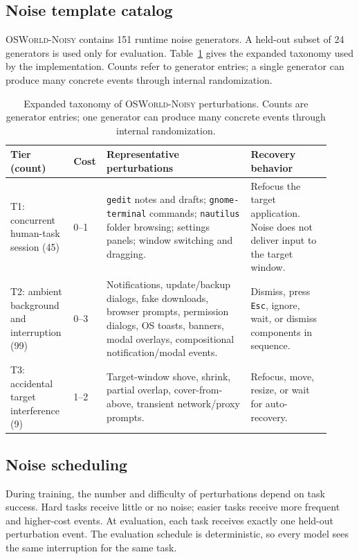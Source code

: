 \documentclass[11pt]{article}
\begin{document}
\subsection{Noise template catalog}
\label{app:noise}

\textsc{OSWorld-Noisy} contains 151 runtime noise generators. A held-out subset of 24 generators is used only for evaluation. Table~\ref{tab:noise-taxonomy-full} gives the expanded taxonomy used by the implementation. Counts refer to generator entries; a single generator can produce many concrete events through internal randomization.

\begin{table}[h]
\centering
\caption{Expanded taxonomy of \textsc{OSWorld-Noisy} perturbations. Counts are generator entries; one generator can produce many concrete events through internal randomization.}
\label{tab:noise-taxonomy-full}
\scriptsize
\begin{tabular}{p{0.18\linewidth} p{0.07\linewidth} p{0.43\linewidth} p{0.24\linewidth}}
\toprule
Tier (count) & Cost & Representative perturbations & Recovery behavior \\
\midrule
T1: concurrent human-task session (45)
& 0--1
& \texttt{gedit} notes and drafts; \texttt{gnome-terminal} commands; \texttt{nautilus} folder browsing; settings panels; window switching and dragging.
& Refocus the target application. Noise does not deliver input to the target window. \\
\midrule
T2: ambient background and interruption (99)
& 0--3
& Notifications, update/backup dialogs, fake downloads, browser prompts, permission dialogs, OS toasts, banners, modal overlays, compositional notification/modal events.
& Dismiss, press \texttt{Esc}, ignore, wait, or dismiss components in sequence. \\
\midrule
T3: accidental target interference (9)
& 1--2
& Target-window shove, shrink, partial overlap, cover-from-above, transient network/proxy prompts.
& Refocus, move, resize, or wait for auto-recovery. \\
\bottomrule
\end{tabular}
\end{table}

\subsection{Noise scheduling}
\label{app:noise-scheduling}

During training, the number and difficulty of perturbations depend on task success. Hard tasks receive little or no noise; easier tasks receive more frequent and higher-cost events. At evaluation, each task receives exactly one held-out perturbation event. The evaluation schedule is deterministic, so every model sees the same interruption for the same task.
\end{document}
